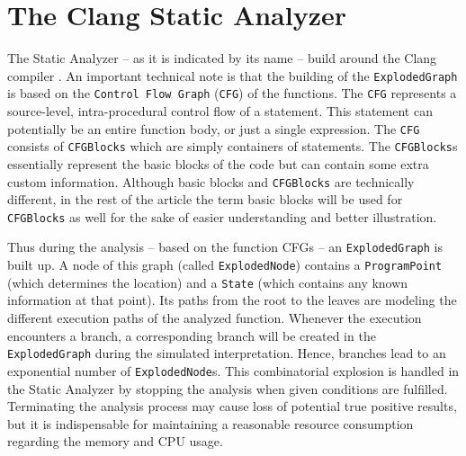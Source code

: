 \documentclass[oneside, a4paper, 12pt]{article}
\theoremstyle{definition}
\begin{document}
\section{The Clang Static Analyzer}

The Static Analyzer -- as it is indicated by its name -- build around the Clang 
compiler \cite{Lattner2008}. An important technical note is that the building 
of the \texttt{ExplodedGraph} is based on the \texttt{Control Flow Graph} 
(\texttt{CFG}) of the functions. The \texttt{CFG} represents a source-level, 
intra-procedural control flow of a 
statement. This statement can potentially be an entire function body, or just a 
single expression. The \texttt{CFG} consists of \texttt{CFGBlocks} which are 
simply containers of statements. The \texttt{CFGBlocks}s essentially represent 
the basic blocks of the code but can contain some extra custom information. 
Although basic blocks and \texttt{CFGBlocks} are technically different, in the 
rest of the article the term basic blocks will be used for \texttt{CFGBlocks} 
as well for the sake of easier understanding and better illustration.

Thus during the analysis -- based on the function CFGs -- an 
\texttt{ExplodedGraph} is built up. A 
node of this graph (called \texttt{ExplodedNode}) contains a 
\texttt{ProgramPoint} (which determines the location) and a \texttt{State} 
(which contains any known information at that point). Its paths from the root 
to the leaves are modeling the different execution paths of the analyzed 
function. Whenever the execution encounters a branch, a corresponding branch 
will be created in the \texttt{ExplodedGraph} during the simulated 
interpretation.
Hence, branches lead to an exponential number of \texttt{ExplodedNode}s.
This combinatorial explosion is handled in the Static Analyzer by stopping 
the analysis when given conditions are fulfilled. Terminating the analysis 
process may cause loss of potential true positive results, but it is 
indispensable for maintaining a reasonable resource consumption regarding the 
memory and CPU usage. 
\end{document}

